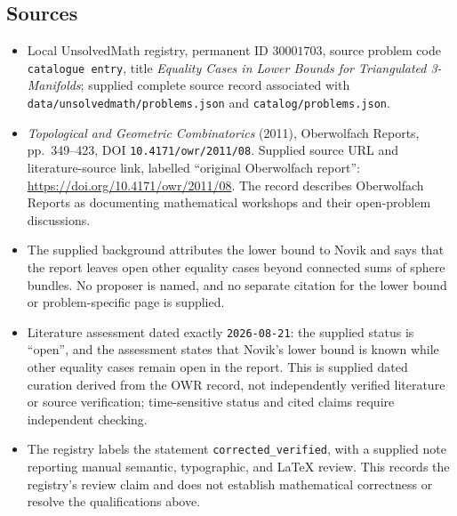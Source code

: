 \documentclass[11pt]{article}
\begin{document}
\subsection{Sources}
\begin{itemize}
\item Local UnsolvedMath registry, permanent ID \(30001703\), source problem code \texttt{catalogue entry}, title \emph{Equality Cases in Lower Bounds for Triangulated 3-Manifolds}; supplied complete source record associated with \texttt{data/unsolvedmath/problems.json} and \texttt{catalog/problems.json}.
\item \emph{Topological and Geometric Combinatorics} (2011), Oberwolfach Reports, pp.~349--423, DOI \texttt{10.4171/owr/2011/08}. Supplied source URL and literature-source link, labelled ``original Oberwolfach report'': \url{https://doi.org/10.4171/owr/2011/08}. The record describes Oberwolfach Reports as documenting mathematical workshops and their open-problem discussions.
\item The supplied background attributes the lower bound to Novik and says that the report leaves open other equality cases beyond connected sums of sphere bundles. No proposer is named, and no separate citation for the lower bound or problem-specific page is supplied.
\item Literature assessment dated exactly \texttt{2026-08-21}: the supplied status is ``open'', and the assessment states that Novik's lower bound is known while other equality cases remain open in the report. This is supplied dated curation derived from the OWR record, not independently verified literature or source verification; time-sensitive status and cited claims require independent checking.
\item The registry labels the statement \texttt{corrected\_verified}, with a supplied note reporting manual semantic, typographic, and LaTeX review. This records the registry's review claim and does not establish mathematical correctness or resolve the qualifications above.
\end{itemize}
\end{document}
